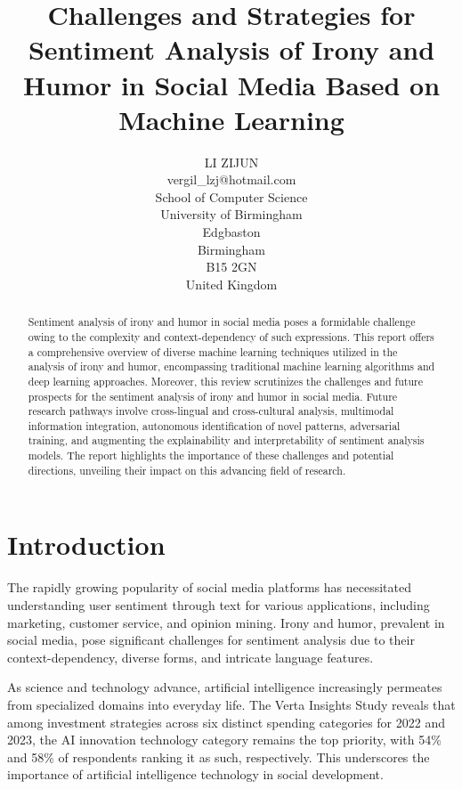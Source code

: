\documentclass[a4paper]{article}
\title{\textbf{Challenges and Strategies for Sentiment Analysis of Irony and Humor in Social Media Based on Machine Learning}}
\author{
    LI ZIJUN\\
    vergil\_lzj@hotmail.com\\
    School of Computer Science\\
    University of Birmingham\\
    Edgbaston\\
    Birmingham\\
    B15 2GN\\
    United Kingdom\\
}
\date{}
\begin{document}
\setlength{\parindent}{2em}

\maketitle
\thispagestyle{empty}

\begin{abstract}
    Sentiment analysis of irony and humor in social media poses a formidable challenge owing to the complexity and context-dependency of such expressions. This report offers a comprehensive overview of diverse machine learning techniques utilized in the analysis of irony and humor, encompassing traditional machine learning algorithms and deep learning approaches.  Moreover, this review scrutinizes the challenges and future prospects for the sentiment analysis of irony and humor in social media. Future research pathways involve cross-lingual and cross-cultural analysis, multimodal information integration, autonomous identification of novel patterns, adversarial training, and augmenting the explainability and interpretability of sentiment analysis models. The report highlights the importance of these challenges and potential directions, unveiling their impact on this advancing field of research.
\end{abstract}


\newpage
\setcounter{page}{1}
\section{Introduction}

The rapidly growing popularity of social media platforms has necessitated understanding user sentiment through text for various applications, including marketing, customer service, and opinion mining. Irony and humor, prevalent in social media, pose significant challenges for sentiment analysis due to their context-dependency, diverse forms, and intricate language features.

As science and technology advance, artificial intelligence increasingly permeates from specialized domains into everyday life. The Verta Insights Study\cite{ref_web1} reveals that among investment strategies across six distinct spending categories for 2022 and 2023, the AI innovation technology category remains the top priority, with 54\% and 58\% of respondents ranking it as such, respectively. This underscores the importance of artificial intelligence technology in social development.
\end{document}
